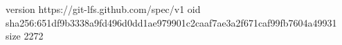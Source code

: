 version https://git-lfs.github.com/spec/v1
oid sha256:651df9b3338a9fd496d0dd1ae979901c2caaf7ae3a2f671caf99fb7604a49931
size 2272
